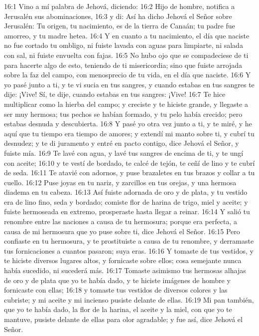 16:1 Vino a mí palabra de Jehová, diciendo:   
16:2 Hijo de hombre, notifica a Jerusalén sus abominaciones,   
16:3 y di: Así ha dicho Jehová el Señor sobre Jerusalén: Tu origen, tu nacimiento, es de la tierra de Canaán; tu padre fue amorreo, y tu madre hetea.   
16:4 Y en cuanto a tu nacimiento, el día que naciste no fue cortado tu ombligo, ni fuiste lavada con aguas para limpiarte, ni salada con sal, ni fuiste envuelta con fajas.   
16:5 No hubo ojo que se compadeciese de ti para hacerte algo de esto, teniendo de ti misericordia; sino que fuiste arrojada sobre la faz del campo, con menosprecio de tu vida, en el día que naciste.   
16:6 Y yo pasé junto a ti, y te vi sucia en tus sangres, y cuando estabas en tus sangres te dije: ¡Vive! Sí, te dije, cuando estabas en tus sangres: ¡Vive!   
16:7 Te hice multiplicar como la hierba del campo; y creciste y te hiciste grande, y llegaste a ser muy hermosa; tus pechos se habían formado, y tu pelo había crecido; pero estabas desnuda y descubierta.   
16:8 Y pasé yo otra vez junto a ti, y te miré, y he aquí que tu tiempo era tiempo de amores; y extendí mi manto sobre ti, y cubrí tu desnudez; y te di juramento y entré en pacto contigo, dice Jehová el Señor, y fuiste mía.   
16:9 Te lavé con agua, y lavé tus sangres de encima de ti, y te ungí con aceite;   
16:10 y te vestí de bordado, te calcé de tejón, te ceñí de lino y te cubrí de seda.   
16:11 Te atavié con adornos, y puse brazaletes en tus brazos y collar a tu cuello.   
16:12 Puse joyas en tu nariz, y zarcillos en tus orejas, y una hermosa diadema en tu cabeza.   
16:13 Así fuiste adornada de oro y de plata, y tu vestido era de lino fino, seda y bordado; comiste flor de harina de trigo, miel y aceite; y fuiste hermoseada en extremo, prosperaste hasta llegar a reinar.   
16:14 Y salió tu renombre entre las naciones a causa de tu hermosura; porque era perfecta, a causa de mi hermosura que yo puse sobre ti, dice Jehová el Señor.   
16:15 Pero confiaste en tu hermosura, y te prostituiste a causa de tu renombre, y derramaste tus fornicaciones a cuantos pasaron; suya eras.   
16:16 Y tomaste de tus vestidos, y te hiciste diversos lugares altos, y fornicaste sobre ellos; cosa semejante nunca había sucedido, ni sucederá más.   
16:17 Tomaste asimismo tus hermosas alhajas de oro y de plata que yo te había dado, y te hiciste imágenes de hombre y fornicaste con ellas;   
16:18 y tomaste tus vestidos de diversos colores y las cubriste; y mi aceite y mi incienso pusiste delante de ellas.   
16:19 Mi pan también, que yo te había dado, la flor de la harina, el aceite y la miel, con que yo te mantuve, pusiste delante de ellas para olor agradable; y fue así, dice Jehová el Señor.   
